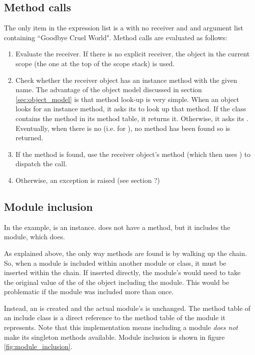 \subsection{Method calls}

The only item in the expression list is a  with no receiver and and argument list containing ``Goodbye Cruel World". Method calls are evaluated as follows:

\begin{enumerate}
  \item Evaluate the receiver. If there is no explicit receiver, the  object in the current scope (the one at the top of the scope stack) is used.
  \item Check whether the receiver object has an instance method with the given name. The advantage of the object model discussed in section \ref{sec:object_model} is that method look-up is very simple. When an object looks for an instance method, it asks its  to look up that method. If the class contains the method in its method table, it returns it. Otherwise, it asks its . Eventually, when there is no  (i.e. for ), no method has been found so  is returned.
  \item If the method is found, use the receiver object's  method (which then uses ) to dispatch the call.
  \item Otherwise, an exception is raised (see section ?)
\end{enumerate}

\subsection{Module inclusion}

In the example,  is an  instance.  does not have a  method, but it includes the  module, which does.

As explained above, the only way methods are found is by walking up the  chain. So, when a module is included within another module or class, it must be inserted within the  chain. If inserted directly, the module's  would need to take the original value of the  of the object including the module. This would be problematic if the module was included more than once.

Instead, an  is created and the actual module's  is unchanged. The method table of an include class is a direct reference to the method table of the module it represents. Note that this implementation means including a module \textit{does not} make its singleton methods available. Module inclusion is shown in figure \ref{fig:module_inclusion}.

